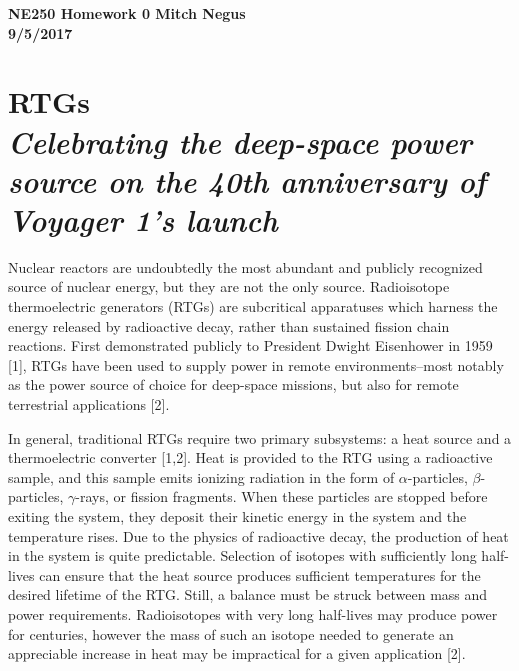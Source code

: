 \documentclass{report}
\newcommand{\tab}{\-\hspace{1cm}}
\begin{document}
\thispagestyle{empty}

{\bf {\large {NE250 Homework {0} \hfill Mitch Negus\\
		\hspace*{\fill} 9/5/2017\\ }}}
\section*{RTGs\\\textit{\normalsize Celebrating the deep-space power source on the 40th anniversary of Voyager 1's launch}}

\begin{multicols}{2}

\tab Nuclear reactors are undoubtedly the most abundant and publicly recognized source of nuclear energy, but they are not the only source. Radioisotope thermoelectric generators (RTGs) are subcritical apparatuses which harness the energy released by radioactive decay, rather than sustained fission chain reactions. First demonstrated publicly to President Dwight Eisenhower in 1959 [1], RTGs have been used to supply power in remote environments--most notably as the power source of choice for deep-space missions, but also for remote terrestrial applications [2]. 

\tab In general, traditional RTGs require two primary subsystems: a heat source and a thermoelectric converter [1,2]. Heat is provided to the RTG using a radioactive sample, and this sample emits ionizing radiation in the form of $\alpha$-particles, $\beta$-particles, $\gamma$-rays, or fission fragments. When these particles are stopped before exiting the system, they deposit their kinetic energy in the system and the temperature rises. Due to the physics of radioactive decay, the production of heat in the system is quite predictable. Selection of isotopes with sufficiently long half-lives can ensure that the heat source produces sufficient temperatures for the desired lifetime of the RTG. Still, a balance must be struck between mass and power requirements. Radioisotopes with very long half-lives may produce power for centuries, however the mass of such an isotope needed to generate an appreciable increase in heat may be impractical for a given application [2].


\end{multicols}
\end{document}

